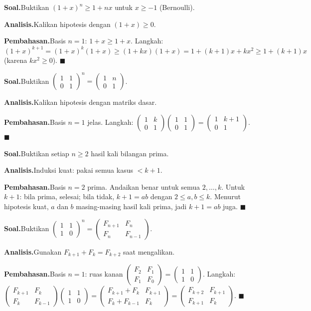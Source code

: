 \documentclass[11pt,a4paper]{report}
\theoremstyle{gaya}
\newcommand{\knomor}[1]{\par\medskip\noindent{\bfseries\color{ungu}#1}\par\nopagebreak}
\newcommand{\ksoal}{\noindent\textbf{\color{biru}Soal.}\space}
\newcommand{\kanalisis}{\par\noindent\textbf{\color{oranye}Analisis.}\space}
\newcommand{\kbahas}{\par\noindent\textbf{\color{hijau}Pembahasan.}\space}
\newcommand{\kbagian}[1]{\par\medskip\noindent{\large\bfseries\color{biru}#1}\par\smallskip}
\begin{document}
\knomor{C.4}
\ksoal Buktikan $(1+x)^n\ge1+nx$ untuk $x\ge-1$ (Bernoulli).
\kanalisis Kalikan hipotesis dengan $(1+x)\ge0$.
\kbahas Basis $n=1$: $1+x\ge1+x$. Langkah: $(1+x)^{k+1}=(1+x)^k(1+x)\ge(1+kx)(1+x)=1+(k+1)x+kx^2\ge1+(k+1)x$ (karena $kx^2\ge0$). $\blacksquare$

\knomor{C.5}
\ksoal Buktikan $\begin{pmatrix}1&1\\0&1\end{pmatrix}^{\!n}=\begin{pmatrix}1&n\\0&1\end{pmatrix}$.
\kanalisis Kalikan hipotesis dengan matriks dasar.
\kbahas Basis $n=1$ jelas. Langkah: $\begin{pmatrix}1&k\\0&1\end{pmatrix}\begin{pmatrix}1&1\\0&1\end{pmatrix}=\begin{pmatrix}1&k+1\\0&1\end{pmatrix}$. $\blacksquare$

\kbagian{Bagian D}

\knomor{D.1}
\ksoal Buktikan setiap $n\ge2$ hasil kali bilangan prima.
\kanalisis Induksi kuat: pakai semua kasus $<k+1$.
\kbahas Basis $n=2$ prima. Andaikan benar untuk semua $2,\dots,k$. Untuk $k+1$: bila prima, selesai; bila tidak, $k+1=ab$ dengan $2\le a,b\le k$. Menurut hipotesis kuat, $a$ dan $b$ masing-masing hasil kali prima, jadi $k+1=ab$ juga. $\blacksquare$

\knomor{D.2}
\ksoal Buktikan $\begin{pmatrix}1&1\\1&0\end{pmatrix}^{\!n}=\begin{pmatrix}F_{n+1}&F_n\\F_n&F_{n-1}\end{pmatrix}$.
\kanalisis Gunakan $F_{k+1}+F_k=F_{k+2}$ saat mengalikan.
\kbahas Basis $n=1$: ruas kanan $\begin{pmatrix}F_2&F_1\\F_1&F_0\end{pmatrix}=\begin{pmatrix}1&1\\1&0\end{pmatrix}$. Langkah: $\begin{pmatrix}F_{k+1}&F_k\\F_k&F_{k-1}\end{pmatrix}\begin{pmatrix}1&1\\1&0\end{pmatrix}=\begin{pmatrix}F_{k+1}+F_k&F_{k+1}\\F_k+F_{k-1}&F_k\end{pmatrix}=\begin{pmatrix}F_{k+2}&F_{k+1}\\F_{k+1}&F_k\end{pmatrix}$. $\blacksquare$
\end{document}
